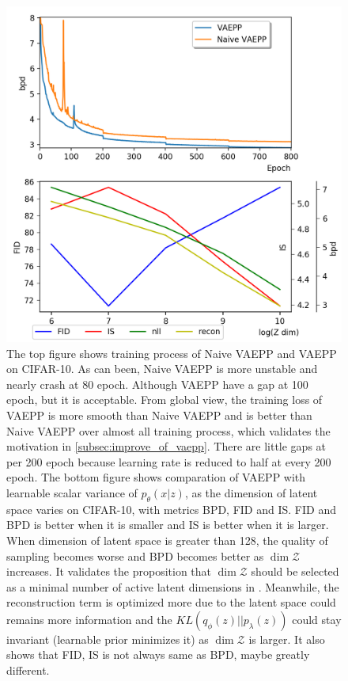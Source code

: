 \begin{figure}[tb]
	\centering
	\includegraphics[width=1.0\columnwidth]{../figures/lossnFID.png}
	\caption{
	The top figure shows training process of Naive VAEPP and VAEPP on CIFAR-10. As can been, Naive VAEPP is more unstable and nearly crash at 80 epoch. Although VAEPP have a gap at 100 epoch, but it is acceptable. From global view, the training loss of VAEPP is more smooth than Naive VAEPP and is better than Naive VAEPP over almost all training process, which validates the motivation in \cref{subsec:improve_of_vaepp}. There are little gaps at per 200 epoch because learning rate is reduced to half at every 200 epoch. 
	The bottom figure shows comparation of VAEPP with learnable scalar variance of $p_\theta(x|z)$, as the dimension of latent space varies on CIFAR-10, with metrics BPD, FID and IS. FID and BPD is better when it is smaller and IS is better when it is larger. When dimension of latent space is greater than 128, the quality of sampling becomes worse and BPD becomes better as $\dim \mathcal{Z}$ increases. It validates the proposition that $\dim \mathcal{Z}$ should be selected as a minimal number of active latent dimensions in \protect\cite{dai2019diagnosing}. Meanwhile, the reconstruction term is optimized more due to the latent space could remains more information and the $KL(q_\phi(z)||p_\lambda(z))$ could stay invariant (learnable prior minimizes it) as $\dim \mathcal{Z}$ is larger. It also shows that FID, IS is not always same as BPD, maybe greatly different. 
	}
	\label{fig:lossnFID}
\end{figure}


